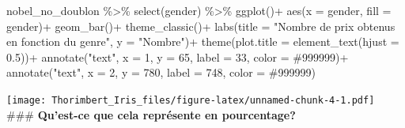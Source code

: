 \documentclass[
]{article}
\newenvironment{Shaded}{\begin{snugshade}}{\end{snugshade}}
\newcommand{\AttributeTok}[1]{\textcolor[rgb]{0.77,0.63,0.00}{#1}}
\newcommand{\DecValTok}[1]{\textcolor[rgb]{0.00,0.00,0.81}{#1}}
\newcommand{\FloatTok}[1]{\textcolor[rgb]{0.00,0.00,0.81}{#1}}
\newcommand{\FunctionTok}[1]{\textcolor[rgb]{0.00,0.00,0.00}{#1}}
\newcommand{\NormalTok}[1]{#1}
\newcommand{\SpecialCharTok}[1]{\textcolor[rgb]{0.00,0.00,0.00}{#1}}
\newcommand{\StringTok}[1]{\textcolor[rgb]{0.31,0.60,0.02}{#1}}
\begin{document}
\begin{Shaded}
\begin{Highlighting}[]
\NormalTok{nobel\_no\_doublon }\SpecialCharTok{\%\textgreater{}\%} 
  \FunctionTok{select}\NormalTok{(gender) }\SpecialCharTok{\%\textgreater{}\%} 
  \FunctionTok{ggplot}\NormalTok{()}\SpecialCharTok{+}
  \FunctionTok{aes}\NormalTok{(}\AttributeTok{x =}\NormalTok{ gender, }\AttributeTok{fill =}\NormalTok{ gender)}\SpecialCharTok{+}
  \FunctionTok{geom\_bar}\NormalTok{()}\SpecialCharTok{+}
  \FunctionTok{theme\_classic}\NormalTok{()}\SpecialCharTok{+}
  \FunctionTok{labs}\NormalTok{(}\AttributeTok{title =} \StringTok{"Nombre de prix obtenus en fonction du genre"}\NormalTok{, }\AttributeTok{y =} \StringTok{"Nombre"}\NormalTok{)}\SpecialCharTok{+}
  \FunctionTok{theme}\NormalTok{(}\AttributeTok{plot.title =} \FunctionTok{element\_text}\NormalTok{(}\AttributeTok{hjust =} \FloatTok{0.5}\NormalTok{))}\SpecialCharTok{+}
  \FunctionTok{annotate}\NormalTok{(}\StringTok{"text"}\NormalTok{, }\AttributeTok{x =} \DecValTok{1}\NormalTok{, }\AttributeTok{y =} \DecValTok{65}\NormalTok{, }\AttributeTok{label =} \DecValTok{33}\NormalTok{, }\AttributeTok{color =} \StringTok{\textquotesingle{}\#999999\textquotesingle{}}\NormalTok{)}\SpecialCharTok{+}
  \FunctionTok{annotate}\NormalTok{(}\StringTok{"text"}\NormalTok{, }\AttributeTok{x =} \DecValTok{2}\NormalTok{, }\AttributeTok{y =} \DecValTok{780}\NormalTok{, }\AttributeTok{label =} \DecValTok{748}\NormalTok{, }\AttributeTok{color =} \StringTok{\textquotesingle{}\#999999\textquotesingle{}}\NormalTok{)}
\end{Highlighting}
\end{Shaded}

\texttt{[image: Thorimbert\_Iris\_files/figure-latex/unnamed-chunk-4-1.pdf]}
\#\#\# \textbf{Qu'est-ce que cela représente en pourcentage?}
\end{document}
